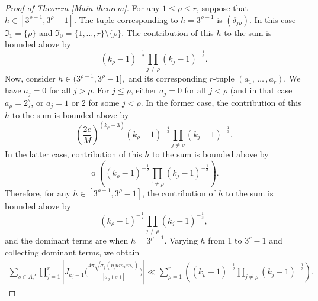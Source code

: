 \documentclass[reqno]{amsart}
\theoremstyle{plain}
\theoremstyle{definition}
\theoremstyle{remark}
\def\o{\operatorname{o}}
\begin{document}
\begin{proof}[Proof of Theorem \ref{Main theorem}]
For any $1 \leq \rho \leq r$, suppose that $h \in [3^{\rho-1},3^{\rho}-1]$. The tuple corresponding to $h = 3^{\rho-1}$ is $(\delta_{j\rho})$. In this case $\mathfrak{I}_1 = \{\rho\}$ and $\mathfrak{I}_0 = \{1, \dots, r\} \setminus \{\rho\}$. The contribution of this $h$ to the sum is bounded above by 
$$ 
(k_{\rho}-1)^{-\frac{1}{2}}\prod_{j \neq \rho}(k_{j}-1)^{-\frac{1}{3}}.
$$ 
Now, consider $ h \in (3^{\rho-1},3^{\rho}-1],$ and its corresponding $r$-tuple $(a_1,\, \dots \,,a_r)$. We have $a_j=0$ for all $j>\rho$. For $j\leq \rho$, either $a_j=0$ for all $j< \rho$ (and in that case $a_\rho = 2$), or $a_j=1$ or $2$ for some $j<\rho$. In the former case, the contribution of this $h$ to the sum is bounded above by  
$$ 
\left(\frac{2 e}{M}\right)^{(k_{\rho}-3)}  (k_{\rho}-1)^{-\frac{4}{3}}\prod_{j\neq \rho}(k_{j}-1)^{-\frac{1}{3}}.
$$ 
In the latter case, contribution of this $h$ to the sum is bounded above by 
$$ 
\o\left((k_{\rho}-1)^{-\frac{1}{2}}\prod_{'\neq \rho}(k_{j}-1)^{-\frac{1}{3}}\right).
$$
Therefore, for any $h \in [3^{\rho-1},3^{\rho}-1]$, the contribution of $h$ to the sum is bounded above by  
$$ 
(k_{\rho}-1)^{-\frac{1}{2}}\prod_{j\neq \rho}(k_{j}-1)^{-\frac{1}{3}},
$$
and the dominant terms are when $h = 3^{\rho - 1}$. Varying $h$ from 1 to $3^r-1$ and collecting dominant terms, we obtain
\begin{align}\label{sinAip}
\sum_{s\in A_i' }    \prod_{j=1}^r\left| J_{k_j-1} \Big(  \frac{4 \pi\sqrt{\sigma_j (\eta_i u m_1m_2 )}}{|\sigma_j(s)|}\Big)\right|
\ll \sum_{\rho = 1}^r \left( (k_{\rho}-1)^{-\frac{1}{2}}\prod_{j \neq \rho}(k_{j}-1)^{-\frac{1}{3}}\right).
\end{align}


\end{proof}
\end{document}

